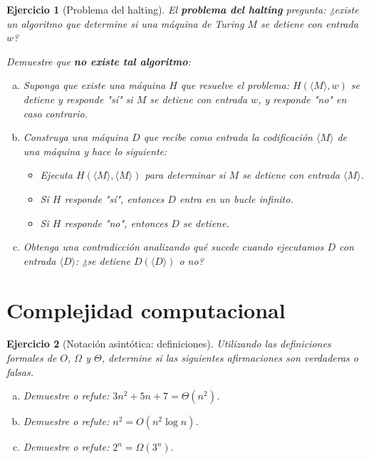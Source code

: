 \documentclass[12pt]{article}
\newtheorem{exercise}{Ejercicio}
\begin{document}
\begin{exercise}[Problema del halting]
El \textbf{problema del halting} pregunta: ¿existe un algoritmo que determine si una máquina de Turing $M$ se detiene con entrada $w$? 

Demuestre que \textbf{no existe tal algoritmo}:
\begin{enumerate}[(a)]
\item Suponga que existe una máquina $H$ que resuelve el problema: $H(\langle M \rangle, w)$ se detiene y responde "sí" si $M$ se detiene con entrada $w$, y responde "no" en caso contrario.
\item Construya una máquina $D$ que recibe como entrada la codificación $\langle M \rangle$ de una máquina y hace lo siguiente:
   \begin{itemize}
   \item Ejecuta $H(\langle M \rangle, \langle M \rangle)$ para determinar si $M$ se detiene con entrada $\langle M \rangle$.
   \item Si $H$ responde "sí", entonces $D$ entra en un bucle infinito.
   \item Si $H$ responde "no", entonces $D$ se detiene.
   \end{itemize}
\item Obtenga una contradicción analizando qué sucede cuando ejecutamos $D$ con entrada $\langle D \rangle$: ¿se detiene $D(\langle D \rangle)$ o no?
\end{enumerate}
\end{exercise}

\section*{Complejidad computacional}

\begin{exercise}[Notación asintótica: definiciones]
Utilizando las definiciones formales de $O$, $\Omega$ y $\Theta$, determine si las siguientes afirmaciones son verdaderas o falsas. 
\begin{enumerate}[(a)]
\item Demuestre o refute: $3n^2 + 5n + 7 = \Theta(n^2)$.
\item Demuestre o refute: $n^2 = O(n^2 \log n)$.
\item Demuestre o refute: $2^n = \Omega(3^n)$.
\end{enumerate}
\end{exercise}
\end{document}
